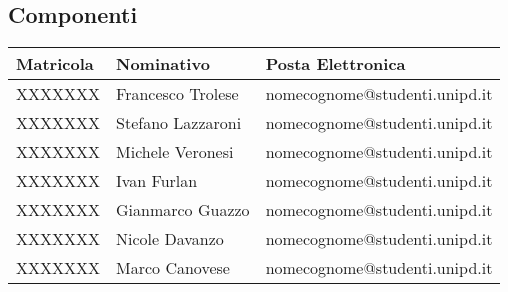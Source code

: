 \subsection{Componenti}
\begin{center}

	\begin{longtable}{p{4cm}|p{4cm}|p{6cm}}
		\arrayrulecolor{white} 
		\hline
		\rowcolor{blue!20}
		\textbf{Matricola} & 
		\textbf{Nominativo} &
		\textbf{Posta Elettronica} \\
		\hline
		XXXXXXX & Francesco Trolese & nomecognome@studenti.unipd.it \\
		XXXXXXX & Stefano Lazzaroni & nomecognome@studenti.unipd.it \\
		XXXXXXX & Michele Veronesi & nomecognome@studenti.unipd.it \\
		XXXXXXX & Ivan Furlan & nomecognome@studenti.unipd.it \\
		XXXXXXX & Gianmarco Guazzo & nomecognome@studenti.unipd.it \\
		XXXXXXX & Nicole Davanzo & nomecognome@studenti.unipd.it \\
		XXXXXXX & Marco Canovese & nomecognome@studenti.unipd.it \\

	\end{longtable}
\end{center}